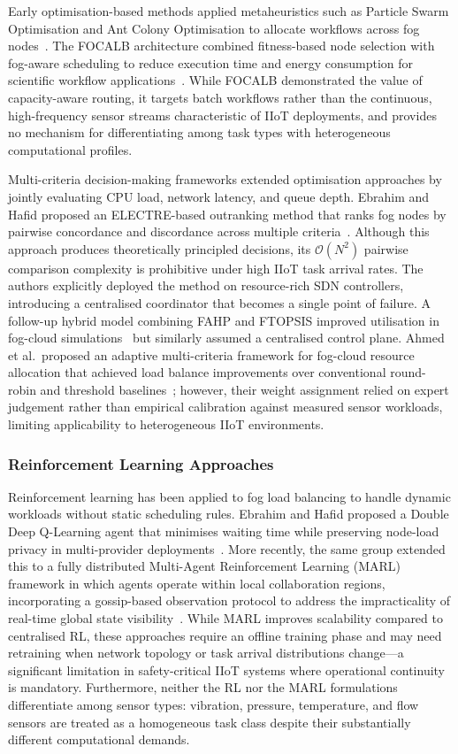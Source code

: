 \documentclass[conference]{IEEEtran}
\begin{document}
Early optimisation-based methods applied metaheuristics such as Particle Swarm Optimisation and Ant Colony Optimisation to allocate workflows across fog nodes~\cite{tripathy2026}. The FOCALB architecture combined fitness-based node selection with fog-aware scheduling to reduce execution time and energy consumption for scientific workflow applications~\cite{kaur2021}. While FOCALB demonstrated the value of capacity-aware routing, it targets batch workflows rather than the continuous, high-frequency sensor streams characteristic of IIoT deployments, and provides no mechanism for differentiating among task types with heterogeneous computational profiles.

Multi-criteria decision-making frameworks extended optimisation approaches by jointly evaluating CPU load, network latency, and queue depth. Ebrahim and Hafid proposed an ELECTRE-based outranking method that ranks fog nodes by pairwise concordance and discordance across multiple criteria~\cite{ebrahim2023b}. Although this approach produces theoretically principled decisions, its $\mathcal{O}(N^2)$ pairwise comparison complexity is prohibitive under high IIoT task arrival rates. The authors explicitly deployed the method on resource-rich SDN controllers, introducing a centralised coordinator that becomes a single point of failure. A follow-up hybrid model combining FAHP and FTOPSIS improved utilisation in fog-cloud simulations~\cite{ahmed2024} but similarly assumed a centralised control plane. Ahmed et al.\ proposed an adaptive multi-criteria framework for fog-cloud resource allocation that achieved load balance improvements over conventional round-robin and threshold baselines~\cite{alshafei2023}; however, their weight assignment relied on expert judgement rather than empirical calibration against measured sensor workloads, limiting applicability to heterogeneous IIoT environments.

\subsubsection{Reinforcement Learning Approaches}

Reinforcement learning has been applied to fog load balancing to handle dynamic workloads without static scheduling rules. Ebrahim and Hafid proposed a Double Deep Q-Learning agent that minimises waiting time while preserving node-load privacy in multi-provider deployments~\cite{ebrahim2023a}. More recently, the same group extended this to a fully distributed Multi-Agent Reinforcement Learning (MARL) framework in which agents operate within local collaboration regions, incorporating a gossip-based observation protocol to address the impracticality of real-time global state visibility~\cite{ebrahim2025}. While MARL improves scalability compared to centralised RL, these approaches require an offline training phase and may need retraining when network topology or task arrival distributions change---a significant limitation in safety-critical IIoT systems where operational continuity is mandatory. Furthermore, neither the RL nor the MARL formulations differentiate among sensor types: vibration, pressure, temperature, and flow sensors are treated as a homogeneous task class despite their substantially different computational demands.
\end{document}
